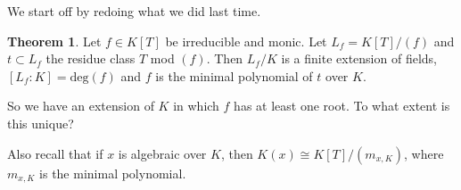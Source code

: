 \documentclass{article}
\theoremstyle{definition}
\newtheorem{theorem}{Theorem}[section]
\begin{document}
\vspace{1mm}

We start off by redoing what we did last time.

\begin{theorem}
    Let $f \in K[T]$ be irreducible and monic. Let $L_f = K[T]/(f)$ and $t \subset L_f$ the residue class $T$ mod $(f)$. Then $L_f/K$ is a finite extension of fields, $[L_f : K] = \text{deg}(f)$ and $f$ is the minimal polynomial of $t$ over $K$.
\end{theorem}
So we have an extension of $K$ in which $f$ has at least one root. To what extent is this unique?

Also recall that if $x$ is algebraic over $K$, then $K(x) \cong K[T]/(m_{x,K})$, where $m_{x,K}$ is the minimal polynomial.
\end{document}
